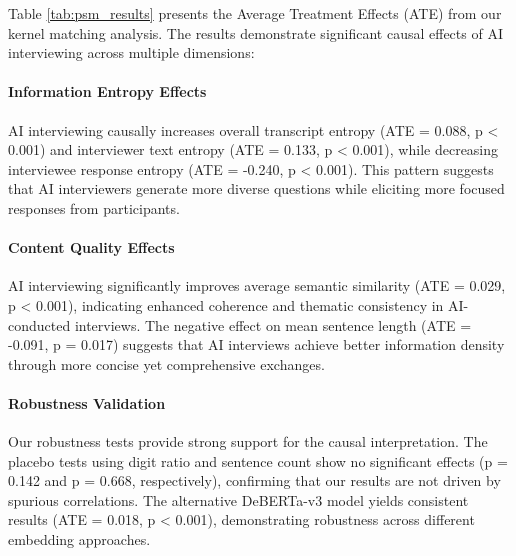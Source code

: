 \documentclass[sigchi,nonacm,manuscript]{acmart}
\begin{document}
Table \ref{tab:psm_results} presents the Average Treatment Effects (ATE) from our kernel matching analysis. The results demonstrate significant causal effects of AI interviewing across multiple dimensions:

\paragraph{Information Entropy Effects} AI interviewing causally increases overall transcript entropy (ATE = 0.088, p < 0.001) and interviewer text entropy (ATE = 0.133, p < 0.001), while decreasing interviewee response entropy (ATE = -0.240, p < 0.001). This pattern suggests that AI interviewers generate more diverse questions while eliciting more focused responses from participants.

\paragraph{Content Quality Effects} AI interviewing significantly improves average semantic similarity (ATE = 0.029, p < 0.001), indicating enhanced coherence and thematic consistency in AI-conducted interviews. The negative effect on mean sentence length (ATE = -0.091, p = 0.017) suggests that AI interviews achieve better information density through more concise yet comprehensive exchanges.

\paragraph{Robustness Validation} Our robustness tests provide strong support for the causal interpretation. The placebo tests using digit ratio and sentence count show no significant effects (p = 0.142 and p = 0.668, respectively), confirming that our results are not driven by spurious correlations. The alternative DeBERTa-v3 model yields consistent results (ATE = 0.018, p < 0.001), demonstrating robustness across different embedding approaches.
\end{document}
